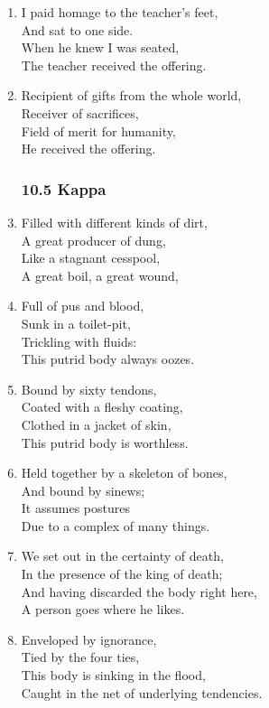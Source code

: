 \documentclass[10pt, openany]{book}
\begin{document}
\begin{enumerate}
\item I paid homage to the teacher’s feet,\\
And sat to one side.\\
When he knew I was seated,\\
The teacher received the offering.

\item Recipient of gifts from the whole world,\\
Receiver of sacrifices,\\
Field of merit for humanity,\\
He received the offering.

\subsubsection*{10.5 Kappa}

\item Filled with different kinds of dirt,\\
A great producer of dung,\\
Like a stagnant cesspool,\\
A great boil, a great wound,

\item Full of pus and blood,\\
Sunk in a toilet-pit,\\
Trickling with fluids:\\
This putrid body always oozes.

\item Bound by sixty tendons,\\
Coated with a fleshy coating,\\
Clothed in a jacket of skin,\\
This putrid body is worthless.

\item Held together by a skeleton of bones,\\
And bound by sinews;\\
It assumes postures\\
Due to a complex of many things.

\item We set out in the certainty of death,\\
In the presence of the king of death;\\
And having discarded the body right here,\\
A person goes where he likes.

\item Enveloped by ignorance,\\
Tied by the four ties,\\
This body is sinking in the flood,\\
Caught in the net of underlying tendencies.


\end{enumerate}
\end{document}
